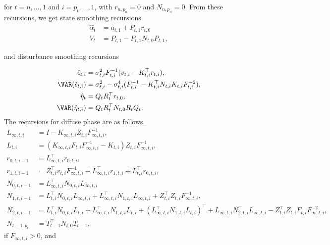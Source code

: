 \documentclass[nojss,article]{jss}\usepackage[]{graphicx}\usepackage[]{color}
\begin{document}
for $t=n,\ldots,1$ and  $i=p_t,\ldots,1$, with $r_{n,p_n}=0$ and $N_{n,p_n}=0$.
From these recursions, we get state smoothing recursions
\begin{equation*} 
\begin{aligned}
\hat\alpha_{t} &= a_{t,1} + P_{t,1}r_{t,0}\\
V_{t} &= P_{t,1}-P_{t,1}N_{t,0}P_{t,1},
\end{aligned} 
\end{equation*}

and disturbance smoothing recursions

\begin{equation*} 
\begin{aligned}
\hat \epsilon_{t,i} &= \sigma^2_{t,i}F_{t,i}^{-1}(v_{t,i} -K_{t,i}^\top r_{t,i}),\\
\VAR(\hat \epsilon_{t,i}) &= \sigma^2_{t,i} -
\sigma^4_{t,i}(F_{t,i}^{-1} -K_{t,i}^\top N_{t,i}K_{t,i}F_{t,i}^{-2}),\\
\hat \eta_{t} &= Q_tR_t^\top r_{t,0},\\
\VAR(\hat \eta_{t,i}) &= Q_tR^\top_t N_{t,0}R_tQ_t.
\end{aligned} 
\end{equation*}
The recursions for diffuse phase are as follows.
\begin{equation*} 
\begin{aligned}
L_{\infty,t,i} &= I - K_{\infty,t,i}Z_{t,i}F_{\infty,t,i}^{-1},\\
L_{t,i} &=
(K_{\infty,t,i}F_{t,i}F_{\infty,t,i}^{-1}-K_{t,i})Z_{t,i}F_{\infty,t,i}^{-1},\\
r_{0,t,i-1} &= L_{\infty,t,i}^\top r_{0,t,i}, \\
r_{1,t,i-1} &= Z_{t,i}^\top v_{t,i}F_{\infty,t,i}^{-1} + L_{\infty,t,i}^\top r_{1,t,i} +
L^\top_{t,i}r_{0,t,i}, \\
N_{0,t,i-1} &= L_{\infty,t,i}^\top N_{0,t,i}L_{\infty,t,i}\\
N_{1,t,i-1} &= L_{t,i}^\top N_{0,t,i}L_{\infty,t,i}+
L_{\infty,t,i}^\top N_{1,t,i}L_{\infty,t,i}+Z_{t,i}^\top Z_{t,i}F_{\infty,t,i}^{-1},\\
N_{2,t,i-1} &= L_{t,i}^\top N_{0,t,i}L_{t,i}+ L_{\infty,t,i}^\top N_{1,t,i}L_{t,i} +
(L_{\infty,t,i}^\top N_{1,t,i}L_{t,i})^\top + 
L_{\infty,t,i}N_{2,t,i}^\top L_{\infty,t,i}-Z_{t,i}^\top Z_{t,i}F_{t,i}F_{\infty,t,i}^{-2},\\
N_{t-1,p_t} &= T_{t-1}^\top N_{t,0}T_{t-1},
\end{aligned} 
\end{equation*}
if $F_{\infty,t,i}>0$, and
\end{document}
